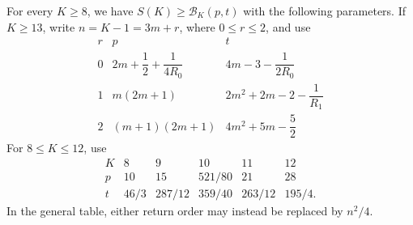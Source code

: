 \begin{theorem}\label{thm:main}
For every $K\ge8$, we have $S(K)\ge\mathcal B_K(p,t)$ with the following
parameters. If $K\ge13$, write $n=K-1=3m+r$, where $0\le r\le2$, and use
\[
\renewcommand{\arraystretch}{1.5}
\begin{array}{c|c|c}
r&p&t\\\hline
0&2m+\dfrac12+\dfrac1{4R_0}&4m-3-\dfrac1{2R_0}\\
1&m(2m+1)&2m^2+2m-2-\dfrac1{R_1}\\
2&(m+1)(2m+1)&4m^2+5m-\dfrac52
\end{array}
\]
For $8\le K\le12$, use
\[
\renewcommand{\arraystretch}{1.2}
\begin{array}{c|ccccc}
K&8&9&10&11&12\\\hline
p&10&15&521/80&21&28\\
t&46/3&287/12&359/40&263/12&195/4.
\end{array}
\]
In the general table, either return order may instead be replaced by
$n^2/4$.
\end{theorem}
